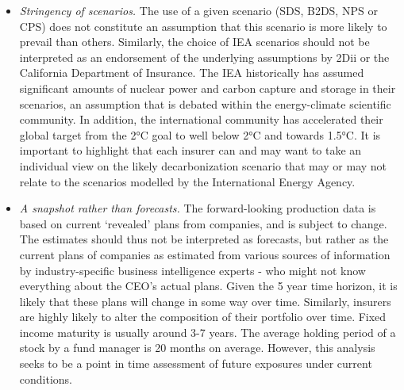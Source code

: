 \documentclass[10pt,table,a4]{article}\usepackage[]{graphicx}\usepackage[]{color}
\begin{document}
	\begin{multicols}{2}
		\begin{itemize}
			\item{\textit{Stringency of scenarios.} The use of a given scenario (SDS, B2DS, NPS or CPS) does not constitute an assumption that this scenario is more likely to prevail than others. Similarly, the choice of IEA scenarios should not be interpreted as an endorsement of the underlying assumptions by 2Dii or the California Department of Insurance. The IEA historically has assumed significant amounts of nuclear power and carbon capture and storage in their scenarios, an assumption that is debated within the energy-climate scientific community. In addition, the international community has accelerated their global target from the 2°C goal to well below 2°C and towards 1.5°C. It is important to highlight that each insurer can and may want to take an individual view on the likely decarbonization scenario that may or may not relate to the scenarios modelled by the International Energy Agency.}
			
			\item{\textit{A snapshot rather than forecasts.} The forward-looking production data is based on current `revealed' plans from companies, and is subject to change. The estimates should thus not be interpreted as forecasts, but rather as the current plans of companies as estimated from various sources of information by industry-specific business intelligence experts - who might not know everything about the CEO's actual plans. Given the 5 year time horizon, it is likely that these plans will change in some way over time. Similarly, insurers are highly likely to alter the composition of their portfolio over time. Fixed income maturity is usually around 3-7 years. The average holding period of a stock by a fund manager is 20 months on average. However, this analysis seeks to be a point in time assessment of future exposures under current conditions.}
			

\end{itemize}
\end{multicols}
\end{document}
